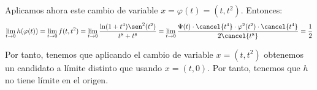 \begin{ejercicio}
\begin{enumerate}
        Aplicamos ahora este cambio de variable $x=\varphi(t)=(t,t^2)$. Entonces:
        \begin{equation*}
            \lim_{t\to 0}h(\varphi(t))
            = \lim_{t\to 0}f(t,t^2)
            = \lim_{t\to 0}
            \frac{\ln(1+t^4)\sen^2(t^2)}{t^8 + t^8}
            = \lim_{t\to 0}
            \frac{\Psi(t)\cdot \cancel{t^4} \cdot\varphi^2(t^2)\cdot \cancel{t^4}}{2\cancel{t^8}}=\frac{1}{2}
        \end{equation*}

        Por tanto, tenemos que aplicando el cambio de variable $x=(t,t^2)$ obtenemos un candidato a límite distinto que usando $x=(t,0)$. Por tanto, tenemos que $h$ no tiene límite en el origen.
    \end{enumerate}
\end{ejercicio}


